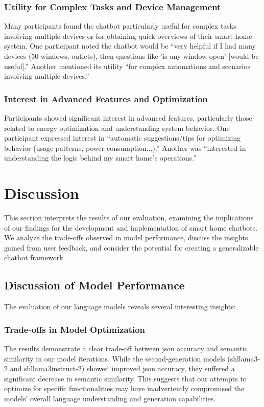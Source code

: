 \subsubsection{Utility for Complex Tasks and Device Management}
Many participants found the chatbot particularly useful for complex tasks involving multiple devices or for obtaining quick overviews of their smart home system. One participant noted the chatbot would be ``very helpful if I had many devices (50 windows, outlets), then questions like 'is any window open' [would be useful].'' Another mentioned its utility ``for complex automations and scenarios involving multiple devices.''
\subsubsection{Interest in Advanced Features and Optimization}
Participants showed significant interest in advanced features, particularly those related to energy optimization and understanding system behavior. One participant expressed interest in ``automatic suggestions/tips for optimizing behavior (usage patterns, power consumption...).'' Another was ``interested in understanding the logic behind my smart home's operations.''



\section{Discussion}
This section interprets the results of our evaluation, examining the implications of our findings for the development and implementation of smart home chatbots. We analyze the trade-offs observed in model performance, discuss the insights gained from user feedback, and consider the potential for creating a generalizable chatbot framework. 

\subsection{Discussion of Model Performance}
The evaluation of our language models reveals several interesting insights:
\subsubsection{Trade-offs in Model Optimization}
The results demonstrate a clear trade-off between \gls{json} accuracy and semantic similarity in our model iterations. While the second-generation models (shllama3-2 and shllama3instruct-2) showed improved \gls{json} accuracy, they suffered a significant decrease in semantic similarity. This suggests that our attempts to optimize for specific functionalities may have inadvertently compromised the models' overall language understanding and generation capabilities.
